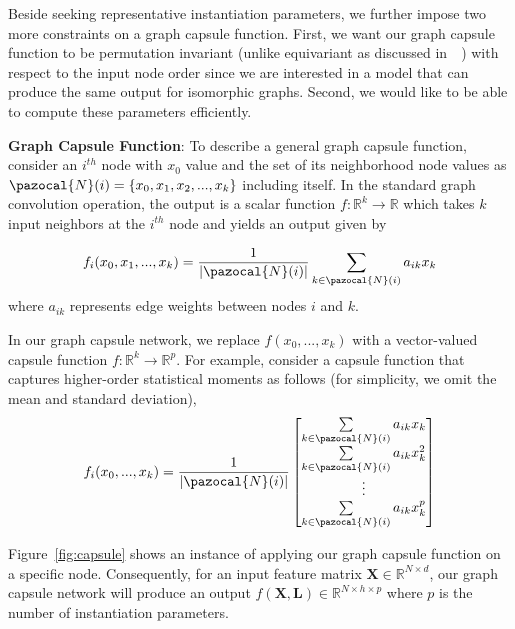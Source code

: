 \documentclass{article}
\newcommand{\Na}{\pazocal{N}}
\begin{document}
Beside seeking representative instantiation parameters, we further impose two  more constraints on a graph capsule function. First, we  want our graph capsule function to be  permutation invariant (unlike equivariant as discussed in~~\cite{hinton2011transforming})  with respect to the input node order since  we are interested in a model that can produce the same output for isomorphic graphs.  Second,  we would like   to be able to compute these parameters efficiently.

\noindent \textbf{Graph Capsule Function}: To describe a general graph capsule function, consider an $i^{th}$ node  with $x_0$ value and the set of its neighborhood node values as $\Na(i)=\{x_0, x_1, x_2,...,x_k\}$ including itself. In the standard graph convolution operation, the output is a scalar function $f:\mathbb{R}^{k}\rightarrow \mathbb{R}$ which takes $k$  input neighbors at the $i^{th}$ node and yields an output given by

\begin{equation}\label{eq:gcnn_op}
\begin{split}
f_i(x_0, x_1,...,x_k) = \frac{1}{|\Na(i)|} \sum_{k \in \Na(i)} a_{ik} x_k \\
\end{split}
\end{equation}
where $a_{ik}$ represents   edge weights between nodes $i$ and $k$. 

In our graph capsule network, we replace $f(x_0,..., x_k)$ with a vector-valued capsule function $f:\mathbb{R}^{k}\rightarrow \mathbb{R}^{p}$. For example, consider a  capsule function that captures higher-order statistical moments as follows (for simplicity, we omit the mean and standard deviation),
\begin{equation}\label{eq:capsule}
\begin{split}
f_i(x_0,...,x_k) &  = \frac{1}{|\Na(i)|} \begin{bmatrix}
	\sum\limits_{k \in \Na(i)} a_{ik} x_k  \\
	\sum\limits_{k \in \Na(i)} a_{ik} x^2_k   \\
	\vdots \\
		\sum\limits_{k \in \Na(i)} a_{ik} x^p_k   \\
	\end{bmatrix}\\
\end{split}
\end{equation}

Figure~\ref{fig:capsule} shows an instance of applying  our graph capsule function   on a specific node. Consequently,  for an input feature matrix $\mathbf{X} \in \mathbb{R}^{N \times d} $, our graph capsule network will produce an output  $f(\mathbf{X}, \mathbf{L}) \in \mathbb{R}^{N \times h \times p} $ where $p$ is the number of instantiation parameters.
\end{document}
